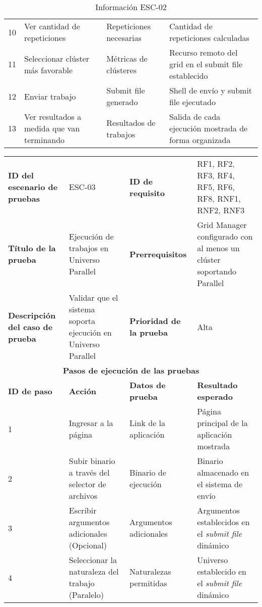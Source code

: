 \begin{table}[H]
\begin{tabular}{|p{2cm}|p{4cm}|p{2.5cm}|p{4.7cm}|}
        10 & Ver cantidad de repeticiones & Repeticiones necesarias & Cantidad de repeticiones calculadas \\
        11 & Seleccionar clúster más favorable & Métricas de clústeres & Recurso remoto del grid en el submit file establecido \\
        12 & Enviar trabajo & Submit file generado & Shell de envío y submit file ejecutado \\
        13 & Ver resultados a medida que van terminando & Resultados de trabajos & Salida de cada ejecución mostrada de forma organizada \\
        \hline
	\end{tabular}
	\caption{Información ESC-02}
	\label{table:esc-02}
\end{table}

\begin{table}[H]
	\centering
	\renewcommand{\arraystretch}{1.2} %
	\fontsize{9pt}{10pt}\selectfont %
	\begin{tabular}{|p{2cm}|p{4cm}|p{2.5cm}|p{4.7cm}|} %
		\hline
		\textbf{ID del escenario de pruebas} & ESC-03 & \textbf{ID de requisito} & RF1, RF2, RF3, RF4, RF5, RF6, RF8, RNF1, RNF2, RNF3 \\
		\textbf{Título de la prueba} & Ejecución de trabajos en Universo Parallel & \textbf{Prerrequisitos} & Grid Manager configurado con al menos un clúster soportando Parallel \\
		\textbf{Descripción del caso de prueba} & Validar que el sistema soporta ejecución en Universo Parallel & \textbf{Prioridad de la prueba} & Alta \\
		\hline
		\multicolumn{4}{|c|}{\textbf{Pasos de ejecución de las pruebas}} \\
		\hline
		\textbf{ID de paso} & \textbf{Acción} & \textbf{Datos de prueba} & \textbf{Resultado esperado} \\
		\hline
		1 & Ingresar a la página & Link de la aplicación & Página principal de la aplicación mostrada \\
		2 & Subir binario a través del selector de archivos & Binario de ejecución & Binario almacenado en el sistema de envío \\
		3 & Escribir argumentos adicionales (Opcional) & Argumentos adicionales & Argumentos establecidos en el \textit{submit file} dinámico \\
		4 & Seleccionar la naturaleza del trabajo (Paralelo) & Naturalezas permitidas & Universo establecido en el \textit{submit file} dinámico \\

\end{tabular}
\end{table}
